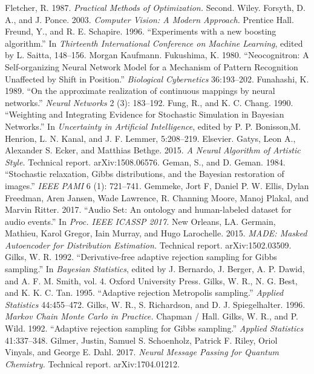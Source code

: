  Fletcher, R. 1987. \emph{Practical Methods of Optimization.} Second. Wiley.
 Forsyth, D. A., and J. Ponce. 2003. \emph{Computer Vision: A Modern Approach.} Prentice Hall.
 Freund, Y., and R. E. Schapire. 1996. ``Experiments with a new boosting algorithm.'' In \emph{Thirteenth International Conference on Machine Learning}, edited by L. Saitta, 148--156. Morgan Kaufmann.
 Fukushima, K. 1980. ``Neocognitron: A Self-organizing Neural Network Model for a Mechanism of Pattern Recognition Unaffected by Shift in Position.'' \emph{Biological Cybernetics} 36:193--202.
 Funahashi, K. 1989. ``On the approximate realization of continuous mappings by neural networks.'' \emph{Neural Networks} 2 (3): 183--192.
 Fung, R., and K. C. Chang. 1990. ``Weighting and Integrating Evidence for Stochastic Simulation in Bayesian Networks.'' In \emph{Uncertainty in Artificial Intelligence}, edited by P. P. Bonisson,M. Henrion, L. N. Kanal, and J. F. Lemmer, 5:208--219. Elsevier.
 Gatys, Leon A., Alexander S. Ecker, and Matthias Bethge. 2015. \emph{A Neural Algorithm of Artistic Style.} Technical report. arXiv:1508.06576.
 Geman, S., and D. Geman. 1984. ``Stochastic relaxation, Gibbs distributions, and the Bayesian restoration of images.'' \emph{IEEE PAMI} 6 (1): 721--741.
 Gemmeke, Jort F, Daniel P. W. Ellis, Dylan Freedman, Aren Jansen, Wade Lawrence, R. Channing Moore, Manoj Plakal, and Marvin Ritter. 2017. ``Audio Set: An ontology and human-labeled dataset for audio events.'' In \emph{Proc. IEEE ICASSP 2017.} New Orleans, LA.
 Germain, Mathieu, Karol Gregor, Iain Murray, and Hugo Larochelle. 2015. \emph{MADE: Masked Autoencoder for Distribution Estimation.} Technical report. arXiv:1502.03509.
 Gilks, W. R. 1992. ``Derivative-free adaptive rejection sampling for Gibbs sampling.'' In \emph{Bayesian Statistics}, edited by J. Bernardo, J. Berger, A. P. Dawid, and A. F. M. Smith, vol. 4. Oxford University Press.
 Gilks, W. R., N. G. Best, and K. K. C. Tan. 1995. ``Adaptive rejection Metropolis sampling.'' \emph{Applied Statistics} 44:455--472.
 Gilks, W. R., S. Richardson, and D. J. Spiegelhalter. 1996. \emph{Markov Chain Monte Carlo in Practice.} Chapman / Hall.
 Gilks, W. R., and P. Wild. 1992. ``Adaptive rejection sampling for Gibbs sampling.'' \emph{Applied Statistics} 41:337--348.
 Gilmer, Justin, Samuel S. Schoenholz, Patrick F. Riley, Oriol Vinyals, and George E. Dahl. 2017. \emph{Neural Message Passing for Quantum Chemistry.} Technical report. arXiv:1704.01212.
